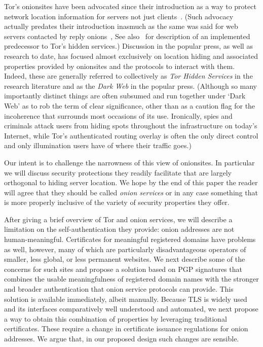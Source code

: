 \documentclass[10pt, conference, compsocconf]{styles/IEEEtran}
\begin{document}
Tor's onionsites have been advocated since their introduction as a way
to protect network location information for servers not just
clients~\cite{tor-design}. (Such advocacy actually predates their
introduction inasmuch as the same was said for web servers contacted
by reply onions~\cite{onion-routing:cacm99}, See also~\cite{rewebber}
for description of an implemented predecessor to Tor's hidden
services.)  Discussion in the popular press, as well as research to
date, has focused almost exclusively on location hiding and associated
properties provided by onionsites and the protocols to interact with
them. Indeed, these are generally referred to collectively as
\emph{Tor Hidden Services} in the research literature and as the
\emph{Dark Web} in the popular press. (Although so many importantly
distinct things are often subsumed and run together under `Dark Web'
as to rob the term of clear significance, other than as a caution flag
for the incoherence that surrounds most occasions of its
use. Ironically, spies and criminals attack users from hiding spots
throughout the infrastructure on today's Internet, while Tor's
authenticated routing overlay is often the only direct control and
only illumination users have of where their traffic goes.)

Our intent is to challenge the narrowness of this view of
onionsites. In particular we will discuss security protections they
readily facilitate that are largely orthogonal to hiding server
location. We hope by the end of this paper the reader will agree that
they should be called \emph{onion services} or in any
case something that is more properly inclusive of the variety of
security properties they offer.


After giving a brief overview of Tor and onion services, we will
describe a limitation on the self-authentication they provide: onion
addresses are not human-meaningful. Certificates for meaningful
registered domains have problems as well, however, many of which are
particularly disadvantageous operators of smaller, less global, or
less permanent websites.  We next describe some of the concerns for
such sites and propose a solution based on PGP signatures that
combines the usable meaningfulness of registered domain names with the
stronger and broader authentication that onion service protocols can
provide.  This solution is available immediately, albeit manually.
Because TLS is widely used and its interfaces comparatively well
understood and automated, we next propose a way to obtain this
combination of properties by leveraging traditional certificates.
These require a change in certificate issuance regulations for onion
addresses.  We argue that, in our proposed design such changes are
sensible.
\end{document}
